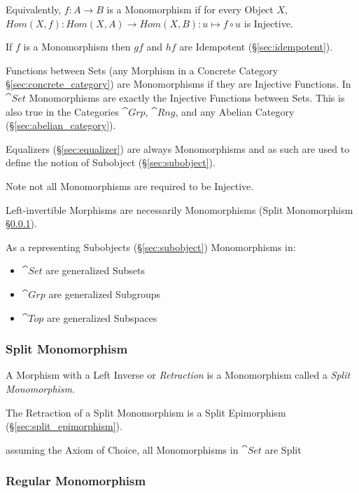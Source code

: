 Equivalently, $f : A \to B$ is a Monomorphism if for every Object $X$,
$Hom(X,f) : Hom(X,A) \to Hom(X,B) : u \mapsto f \circ u$ is Injective.

If $f$ is a Monomorphism then $gf$ and $hf$ are Idempotent
(\S\ref{sec:idempotent}). %

Functions between Sets (any Morphism in a Concrete Category
\S\ref{sec:concrete_category}) are Monomorphisms if they are Injective
Functions. In $\cat{Set}$ Monomorphisms are exactly the Injective Functions
between Sets. This is also true in the Categories $\cat{Grp}$, $\cat{Rng}$, and
any Abelian Category (\S\ref{sec:abelian_category}).

Equalizers (\S\ref{sec:equalizer}) are always Monomorphisms and as such are used
to define the notion of Subobject (\S\ref{sec:subobject}).

\fist Note not all Monomorphisms are required to be Injective.

Left-invertible Morphisms are necessarily Monomorphisms (Split Monomorphism
\S\ref{sec:split_monomorphism}).

As a representing Subobjects (\S\ref{sec:subobject}) Monomorphisms in:
\begin{itemize}
  \item $\cat{Set}$ are generalized Subsets
  \item $\cat{Grp}$ are generalized Subgroups
  \item $\cat{Top}$ are generalized Subspaces
\end{itemize}



\subsubsection{Split Monomorphism}\label{sec:split_monomorphism}

A Morphism with a Left Inverse or \emph{Retraction} is a Monomorphism
called a \emph{Split Monomorphism}.

The Retraction of a Split Monomorphism is a Split Epimorphism
(\S\ref{sec:split_epimorphism}).

assuming the Axiom of Choice, all Monomorphisms in $\cat{Set}$ are
Split



\subsubsection{Regular Monomorphism}\label{sec:regular_monomorphism}

